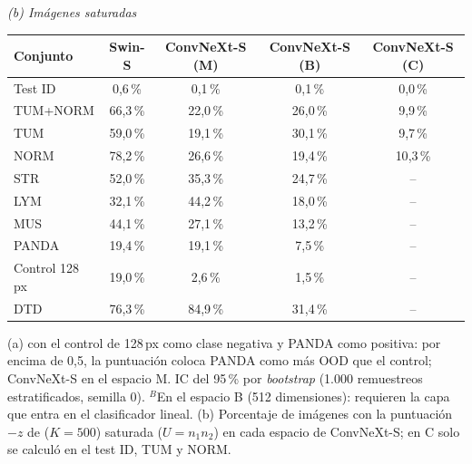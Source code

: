 \begin{table}
\bigskip
\textit{(b) Imágenes saturadas}\par\smallskip
\begin{tabular*}{\linewidth}{@{\extracolsep{\fill}}lcccc}
\toprule
Conjunto & Swin-S & ConvNeXt-S (M) & ConvNeXt-S (B) & ConvNeXt-S (C) \\
\midrule
Test ID & 0{,}6\,\% & 0{,}1\,\% & 0{,}1\,\% & 0{,}0\,\% \\
TUM+NORM & 66{,}3\,\% & 22{,}0\,\% & 26{,}0\,\% & 9{,}9\,\% \\
TUM & 59{,}0\,\% & 19{,}1\,\% & 30{,}1\,\% & 9{,}7\,\% \\
NORM & 78{,}2\,\% & 26{,}6\,\% & 19{,}4\,\% & 10{,}3\,\% \\
STR & 52{,}0\,\% & 35{,}3\,\% & 24{,}7\,\% & -- \\
LYM & 32{,}1\,\% & 44{,}2\,\% & 18{,}0\,\% & -- \\
MUS & 44{,}1\,\% & 27{,}1\,\% & 13{,}2\,\% & -- \\
PANDA & 19{,}4\,\% & 19{,}1\,\% & 7{,}5\,\% & -- \\
Control 128\,px & 19{,}0\,\% & 2{,}6\,\% & 1{,}5\,\% & -- \\
DTD & 76{,}3\,\% & 84{,}9\,\% & 31{,}4\,\% & -- \\
\bottomrule
\end{tabular*}

\smallskip
\parbox{\linewidth}{\scriptsize (a) \AUROC con el control de 128\,px como clase negativa y PANDA como positiva: por encima de 0,5, la puntuación coloca PANDA como más OOD que el control; ConvNeXt-S en el espacio M. IC del 95\,\% por \emph{bootstrap} (1.000 remuestreos estratificados, semilla 0). $^{B}$En el espacio B (512 dimensiones): requieren la capa que entra en el clasificador lineal. (b) Porcentaje de imágenes con la puntuación $-z$ de \stoodx ($K=500$) saturada ($U=n_1n_2$) en cada espacio de ConvNeXt-S; en C solo se calculó en el test ID, TUM y NORM.}
\end{table}
